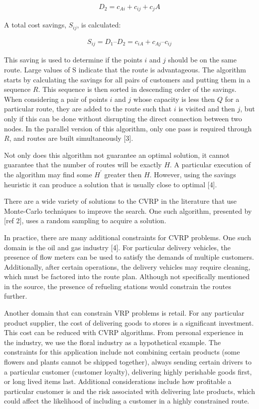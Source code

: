 \documentclass[12pt]{article}
\begin{document}
\begin{align*}
D_2 = c_{Ai} + c_{ij} + c_jA
\end{align*}

A total cost savings, $S_{ij}$, is calculated:

\begin{align*}
S_{ij} = D_1 – D_2 = c_{iA} + c_{Aj} – c_{ij}
\end{align*}

This saving is used to determine if the points $i$ and $j$ should be on the same route. Large values of S indicate that the route is advantageous. 
The algorithm starts by calculating the savings for all pairs of customers and putting them in a sequence $R$. This sequence is then sorted in descending order of the savings. When considering a pair of points $i$ and $j$ whose capacity is less then $Q$ for a particular route, they are added to the route such that $i$ is visited and then $j$, but only if this can be done without disrupting the direct connection between two nodes. In the parallel version of this algorithm, only one pass is required through $R$, and routes are built simultaneously [3].

Not only does this algorithm not guarantee an optimal solution, it cannot guarantee that the number of routes will be exactly $H$. A particular execution of the algorithm may find some $H^\prime$ greater then $H$. However, using the savings heuristic it can produce a solution that is usually close to optimal [4].

There are a wide variety of solutions to the CVRP in the literature that use Monte-Carlo techniques to improve the search. One such algorithm, presented by [ref 2], uses a random sampling to acquire a solution.

In practice, there are many additional constraints for CVRP problems. One such domain is the oil and gas industry [4]. For particular delivery vehicles, the presence of flow meters can be used to satisfy the demands of multiple customers. Additionally, after certain operations, the delivery vehicles may require cleaning, which must be factored into the route plan. Although not specifically mentioned in the source, the presence of refueling stations would constrain the routes further.

Another domain that can constrain VRP problems is retail. For any particular product supplier, the cost of delivering goods to stores is a significant investment. This cost can be reduced with CVRP algorithms. From personal experience in the industry, we use the floral industry as a hypothetical example. The constraints for this application include not combining certain products (some flowers and plants cannot be shipped together), always sending certain drivers to a particular customer (customer loyalty), delivering highly perishable goods first, or long lived items last. Additional considerations include how profitable a particular customer is and the risk associated with delivering late products, which could affect the likelihood of including a customer in a highly constrained route.
\end{document}
